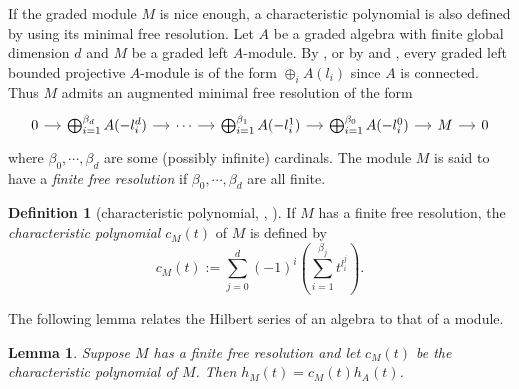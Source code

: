 \documentclass[reqno]{amsart}
\numberwithin{equation}{section}
\theoremstyle{plain}
\newtheorem{lem}[equation]{Lemma}
\theoremstyle{definition}
\newtheorem{de}[equation]{Definition}
\begin{document}

If the graded module $M$ is nice enough, a characteristic polynomial is also defined by using its minimal free resolution. Let $A$ be a graded algebra with finite global dimension $d$ and $M$ be a graded left $A$-module. By \cite[p. 339]{ArtinTateVandenBergh}, or by \cite[Lemma 2.6]{MinamotoMori} and \cite[Section 2.1]{ReyesRogalski}, every graded left bounded projective $A$-module is of the form $\oplus_i A(l_i)$ since $A$ is connected. Thus $M$ admits an augmented minimal free resolution of the form
\[\begin{tikzcd}[column sep=small]
	0 & {\bigoplus^{\beta_d}_{i=1}A(-l^d_i)} & \cdots & {\bigoplus^{\beta_1}_{i=1}A(-l^1_i)} & {\bigoplus^{\beta_0}_{i=1}A(-l^0_i)} & M & 0
	\arrow[from=1-1, to=1-2]
	\arrow[from=1-2, to=1-3]
	\arrow[from=1-3, to=1-4]
	\arrow[from=1-4, to=1-5]
	\arrow[from=1-5, to=1-6]
	\arrow[from=1-6, to=1-7]
\end{tikzcd}\]
    where $\beta_0, \cdots, \beta_d$ are some (possibly infinite) cardinals. The module $M$ is said to have a \emph{finite free resolution} if $\beta_0, \cdots, \beta_d$ are all finite.

\begin{de}[characteristic polynomial, \cite{ArtinTateVandenBergh}, \cite{StephensonZhang}]
     If $M$ has a finite free resolution, the \emph{characteristic polynomial} $c_M(t)$ of $M$ is defined by
    $$c_M(t):=\sum^d_{j=0}(-1)^i\left(\sum^{\beta_j}_{i=1}t^{l^j_i}\right).$$
\end{de}

The following lemma relates the Hilbert series of an algebra to that of a module. 

\begin{lem}\cite[Lemma 2.3]{StephensonZhang}\label{2.3}
Suppose $M$ has a finite free resolution and let $c_M(t)$
be the characteristic polynomial of $M$. Then $h_M(t)=c_M(t)h_A(t)$.
\end{lem}
\end{document}
